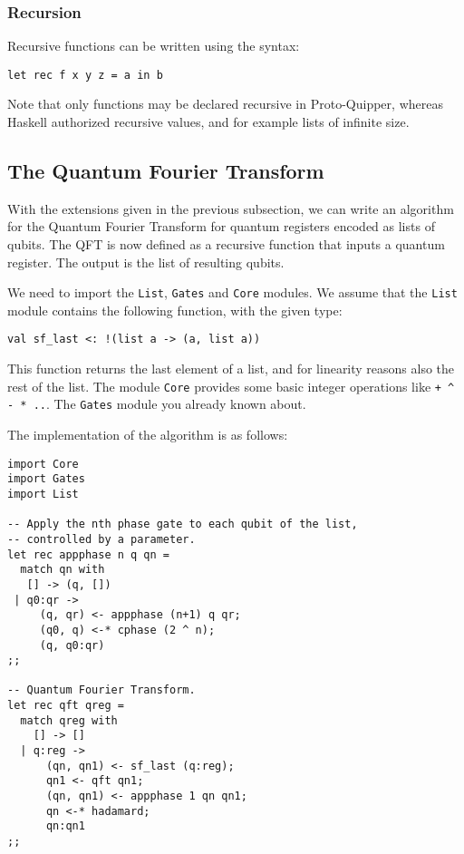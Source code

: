 \subsubsection{Recursion}

Recursive functions can be written using the syntax:
\begin{verbatim}
let rec f x y z = a in b
\end{verbatim}
Note that only functions may be declared recursive in Proto-Quipper, whereas 
Haskell authorized recursive values, and for example lists of infinite size.

\subsection{The Quantum Fourier Transform}

With the extensions given in the previous subsection, we can write an 
algorithm for the Quantum Fourier Transform for quantum registers encoded 
as lists of qubits. The QFT is now defined as a recursive function that 
inputs a quantum register. The output is the list of resulting qubits. 

We need to import the \verb#List#, \verb#Gates# and \verb#Core# modules. 
We assume that the \verb#List# module contains the following function, 
with the given type:
\begin{verbatim}
val sf_last <: !(list a -> (a, list a))
\end{verbatim}
This function returns the last element of a list, and for linearity reasons 
also the rest of the list. The module \verb#Core# provides some basic integer 
operations like \verb#+ ^ - * ..#. The \verb#Gates# module you already known 
about.

The implementation of the algorithm is as follows:

\begin{verbatim}
import Core
import Gates
import List

-- Apply the nth phase gate to each qubit of the list, 
-- controlled by a parameter.
let rec appphase n q qn =
  match qn with
   [] -> (q, [])
 | q0:qr ->
     (q, qr) <- appphase (n+1) q qr;
     (q0, q) <-* cphase (2 ^ n);
     (q, q0:qr)
;;

-- Quantum Fourier Transform.
let rec qft qreg =
  match qreg with
    [] -> []
  | q:reg ->
      (qn, qn1) <- sf_last (q:reg);
      qn1 <- qft qn1;
      (qn, qn1) <- appphase 1 qn qn1;
      qn <-* hadamard;
      qn:qn1
;;
\end{verbatim}
